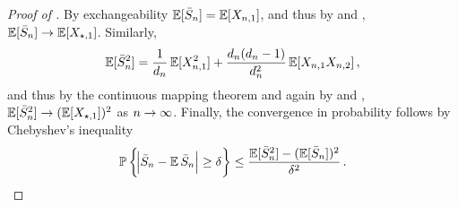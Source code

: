 \begin{proof}[Proof of ]
    By exchangeability $\operatorname*{\mathbb{E}} [\bar{S}_{n}] = \operatorname*{\mathbb{E}} [X_{n, 1}]$, and thus by  and , $\operatorname*{\mathbb{E}} [\bar{S}_{n}] \to \operatorname*{\mathbb{E}} [ X_{\star, 1}]$.
    Similarly, 
    \begin{align*}
        \operatorname*{\mathbb{E}}[ \bar{S}_n^2 ]
        =
        \frac{1}{d_{n}}
        \operatorname*{\mathbb{E}} [X_{n, 1}^2]
        +
        \frac{d_{n} (d_{n} - 1)}{d_{n}^2}
        \operatorname*{\mathbb{E}} [ X_{n, 1} X_{n, 2}]
        \, ,
    \end{align*}
    and thus by the continuous mapping theorem and again by  and , $\operatorname*{\mathbb{E}}[ \bar{S}_n^2 ] \to (\operatorname*{\mathbb{E}}[ X_{\star,1} ] )^2$ as $n \to \infty$.
    Finally, the convergence in probability follows by Chebyshev's inequality
    \begin{equation*}
        \operatorname{\mathbb{P}} \left\{
            \abs{\bar{S}_{n} - \operatorname*{\mathbb{E}} \bar{S}_{n} }
            \geq
            \delta
        \right\}
        \leq
        \frac{
            \operatorname*{\mathbb{E}}[ \bar{S}_n^2 ]
            -
            (\operatorname*{\mathbb{E}} [\bar{S}_n])^2
        }{
            \delta^2
        }
        \, .
        \qedhere
    \end{equation*}
\end{proof}


